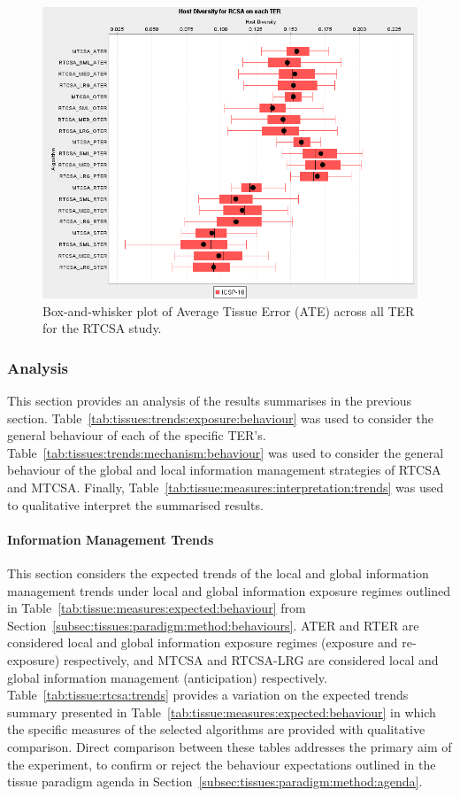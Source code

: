 \begin{figure}[htp]
	\centering
		\includegraphics[scale=0.65]{Tissues/RTCSA-ATE}
	\caption{Box-and-whisker plot of Average Tissue Error (ATE) across all TER for the RTCSA study.}
	\label{fig:tissues:rtcsa:ate:boxplot}
\end{figure}

%
%
\subsubsection{Analysis}
This section provides an analysis of the results summarises in the previous section. Table~\ref{tab:tissues:trends:exposure:behaviour} was used to consider the general behaviour of each of the specific TER's. Table~\ref{tab:tissues:trends:mechanism:behaviour} was used to consider the general behaviour of the global and local information management strategies of RTCSA and MTCSA. Finally, Table~\ref{tab:tissue:measures:interpretation:trends} was used to qualitative interpret the summarised results.

%
%
\paragraph{Information Management Trends}
This section considers the expected trends of the local and global information management trends under local and global information exposure regimes outlined in Table~\ref{tab:tissue:measures:expected:behaviour} from Section~\ref{subsec:tissues:paradigm:method:behaviours}. ATER and RTER are considered local and global information exposure regimes (exposure and re-exposure) respectively, and MTCSA and RTCSA-LRG are considered local and global information management (anticipation) respectively. Table~\ref{tab:tissue:rtcsa:trends} provides a variation on the expected trends summary presented in Table~\ref{tab:tissue:measures:expected:behaviour} in which the specific measures of the selected algorithms are provided with qualitative comparison. Direct comparison between these tables addresses the primary aim of the experiment, to confirm or reject the behaviour expectations outlined in the tissue paradigm agenda in Section~\ref{subsec:tissues:paradigm:method:agenda}.


